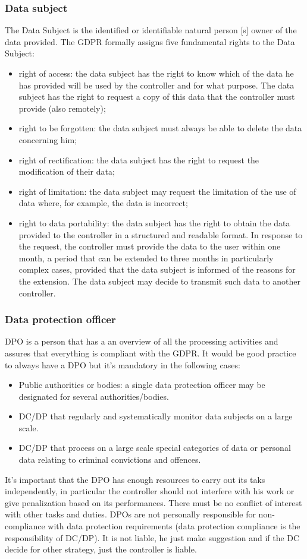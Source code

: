 \subsubsection{Data subject}
The Data Subject is the identified or identifiable natural person [s] owner of the data provided. The GDPR formally assigns five fundamental rights to the Data Subject:
\begin{itemize}
    \item right of access: the data subject has the right to know which of the data he has provided will be used by the controller and for what purpose. The data subject has the right to request a copy of this data that the controller must provide (also remotely);
    \item right to be forgotten: the data subject must always be able to delete the data concerning him;
    \item right of rectification: the data subject has the right to request the modification of their data;
    \item right of limitation: the data subject may request the limitation of the use of data where, for example, the data is incorrect;
    \item right to data portability: the data subject has the right to obtain the data provided to the controller in a structured and readable format. In response to the request, the controller must provide the data to the user within one month, a period that can be extended to three months in particularly complex cases, provided that the data subject is informed of the reasons for the extension. The data subject may decide to transmit such data to another controller.
\end{itemize}
\subsubsection{Data protection officer}
DPO is a person that has a an overview of all the processing activities and assures that everything is compliant with the GDPR. It would be good practice to always have a DPO but it's mandatory in the following cases:
\begin{itemize}
    \item Public authorities or bodies: a single data protection officer may be designated for several authorities/bodies.
    \item  DC/DP that regularly and systematically monitor data subjects on a large scale.
    \item  DC/DP that process on a large scale special categories of data or personal data relating to criminal convictions and offences.
\end{itemize}
It's important that the DPO has enough resources to carry out its taks independently, in particular the controller should not interfere with his work or give penalization based on its performances. There must be no conflict of interest with other tasks and duties.
DPOs are not personally responsible for non-compliance with data protection requirements (data protection compliance is the responsibility of DC/DP). It is not liable, he just make suggestion and if the DC decide for other strategy, just the controller is liable.
